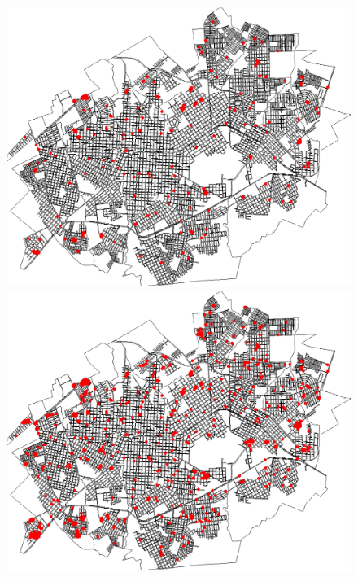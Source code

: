 \begin{figure}[H]
\begin{minipage}{.5\textwidth}
    \captionsetup{labelformat=empty}
  \end{minipage}
  \begin{minipage}{.5\textwidth}
    \centering
    \includegraphics[width=1.0\textwidth]{Figuras/Resultados/0002/Saidas_GPU_BIT/MonteCarlo_0/Simulacao_0/Espacial/00080.png}
    \captionsetup{labelformat=empty}
  \end{minipage}%
  \centering
  \begin{minipage}{.5\textwidth}
    \centering
    \includegraphics[width=1.0\textwidth]{Figuras/Resultados/0002/Saidas_GPU_BIT/MonteCarlo_0/Simulacao_0/Espacial/00120.png}

\end{minipage}
\end{figure}
